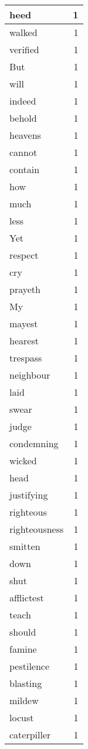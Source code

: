 \begin{center}
\begin{longtable}{l|r}
heed & 1 \\ \hline
walked & 1 \\ \hline
verified & 1 \\ \hline
But & 1 \\ \hline
will & 1 \\ \hline
indeed & 1 \\ \hline
behold & 1 \\ \hline
heavens & 1 \\ \hline
cannot & 1 \\ \hline
contain & 1 \\ \hline
how & 1 \\ \hline
much & 1 \\ \hline
less & 1 \\ \hline
Yet & 1 \\ \hline
respect & 1 \\ \hline
cry & 1 \\ \hline
prayeth & 1 \\ \hline
My & 1 \\ \hline
mayest & 1 \\ \hline
hearest & 1 \\ \hline
trespass & 1 \\ \hline
neighbour & 1 \\ \hline
laid & 1 \\ \hline
swear & 1 \\ \hline
judge & 1 \\ \hline
condemning & 1 \\ \hline
wicked & 1 \\ \hline
head & 1 \\ \hline
justifying & 1 \\ \hline
righteous & 1 \\ \hline
righteousness & 1 \\ \hline
smitten & 1 \\ \hline
down & 1 \\ \hline
shut & 1 \\ \hline
afflictest & 1 \\ \hline
teach & 1 \\ \hline
should & 1 \\ \hline
famine & 1 \\ \hline
pestilence & 1 \\ \hline
blasting & 1 \\ \hline
mildew & 1 \\ \hline
locust & 1 \\ \hline
caterpiller & 1 \\ \hline

\end{longtable}
\end{center}
